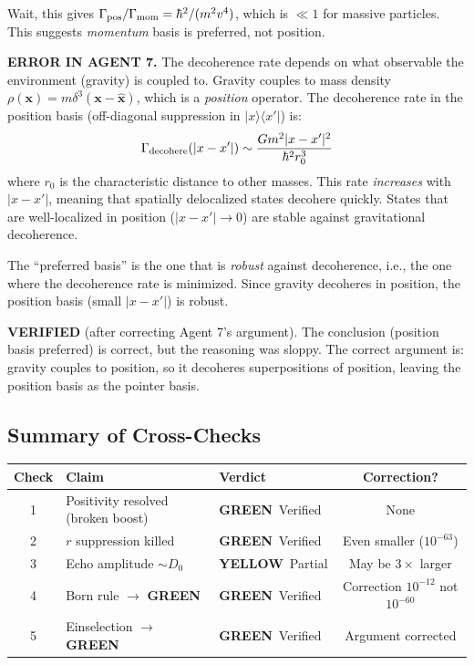\documentclass[11pt,a4paper]{article}
\newcommand{\GREEN}{\textcolor{dfdgreen}{\textbf{GREEN}}}
\newcommand{\YELLOW}{\textcolor{dfdyellow}{\textbf{YELLOW}}}
\begin{document}
Wait, this gives $\Gamma_{\rm pos}/\Gamma_{\rm mom} = \hbar^2/(m^2v^4)$, which is $\ll 1$ for massive particles. This suggests \emph{momentum} basis is preferred, not position.

\textbf{ERROR IN AGENT 7.} The decoherence rate depends on what observable the environment (gravity) is coupled to. Gravity couples to mass density $\rho(\mathbf{x}) = m\delta^3(\mathbf{x} - \hat{\mathbf{x}})$, which is a \emph{position} operator. The decoherence rate in the position basis (off-diagonal suppression in $|x\rangle\langle x'|$) is:
\begin{equation}
\Gamma_{\rm decohere}(|x-x'|) \sim \frac{Gm^2|x-x'|^2}{\hbar^2 r_0^3}
\end{equation}
where $r_0$ is the characteristic distance to other masses. This rate \emph{increases} with $|x-x'|$, meaning that spatially delocalized states decohere quickly. States that are well-localized in position ($|x-x'| \to 0$) are stable against gravitational decoherence.

The ``preferred basis'' is the one that is \emph{robust} against decoherence, i.e., the one where the decoherence rate is minimized. Since gravity decoheres in position, the position basis (small $|x-x'|$) is robust.

\textcolor{dfdgreen}{\textbf{VERIFIED}} (after correcting Agent 7's argument). The conclusion (position basis preferred) is correct, but the reasoning was sloppy. The correct argument is: gravity couples to position, so it decoheres superpositions of position, leaving the position basis as the pointer basis.

\subsection{Summary of Cross-Checks}

\begin{center}
\begin{tabular}{cllc}
\toprule
\textbf{Check} & \textbf{Claim} & \textbf{Verdict} & \textbf{Correction?} \\
\midrule
1 & Positivity resolved (broken boost) & \GREEN\ Verified & None \\
2 & $r$ suppression killed & \GREEN\ Verified & Even smaller ($10^{-63}$) \\
3 & Echo amplitude $\sim D_0$ & \YELLOW\ Partial & May be $3\times$ larger \\
4 & Born rule $\to$ \GREEN & \GREEN\ Verified & Correction $10^{-12}$ not $10^{-60}$ \\
5 & Einselection $\to$ \GREEN & \GREEN\ Verified & Argument corrected \\
\bottomrule
\end{tabular}
\end{center}
\end{document}

